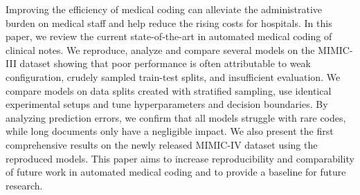 Improving the efficiency of medical coding can alleviate the administrative burden on medical staff and help reduce the rising costs for hospitals. 
In this paper, we review the current state-of-the-art in automated medical coding of clinical notes. 
We reproduce, analyze and compare several models on the MIMIC-III dataset showing that poor performance is often attributable to weak configuration, crudely sampled train-test splits, and insufficient evaluation. 
We compare models on data splits created with stratified sampling, use identical experimental setups and tune hyperparameters and decision boundaries. 
By analyzing prediction errors, we confirm that all models struggle with rare codes, while long documents only have a negligible impact. 
We also present the first comprehensive results on the newly released MIMIC-IV dataset using the reproduced models. 
This paper aims to increase reproducibility and comparability of future work in automated medical coding and to provide a baseline for future research. 
